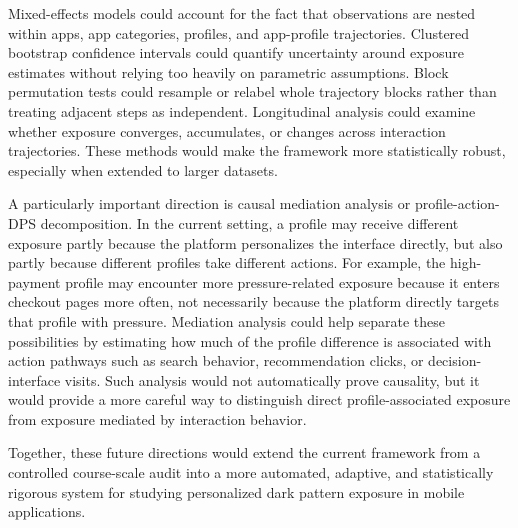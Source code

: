 Mixed-effects models could account for the fact that observations are nested within apps, app categories, profiles, and app-profile trajectories. Clustered bootstrap confidence intervals could quantify uncertainty around exposure estimates without relying too heavily on parametric assumptions. Block permutation tests could resample or relabel whole trajectory blocks rather than treating adjacent steps as independent. Longitudinal analysis could examine whether exposure converges, accumulates, or changes across interaction trajectories. These methods would make the framework more statistically robust, especially when extended to larger datasets.

A particularly important direction is causal mediation analysis or profile-action-DPS decomposition. In the current setting, a profile may receive different exposure partly because the platform personalizes the interface directly, but also partly because different profiles take different actions. For example, the high-payment profile may encounter more pressure-related exposure because it enters checkout pages more often, not necessarily because the platform directly targets that profile with pressure. Mediation analysis could help separate these possibilities by estimating how much of the profile difference is associated with action pathways such as search behavior, recommendation clicks, or decision-interface visits. Such analysis would not automatically prove causality, but it would provide a more careful way to distinguish direct profile-associated exposure from exposure mediated by interaction behavior.

Together, these future directions would extend the current framework from a controlled course-scale audit into a more automated, adaptive, and statistically rigorous system for studying personalized dark pattern exposure in mobile applications.
